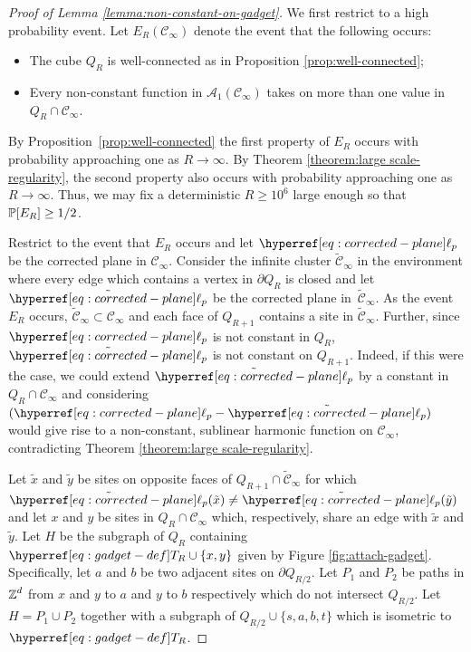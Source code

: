 \documentclass[12pt]{amsart}
\numberwithin{equation}{section}
\begin{document}
	\begin{proof}[Proof of Lemma \ref{lemma:non-constant-on-gadget}]
		We first restrict to a high probability event. Let $E_R(\mathscr{C}_{\infty})$ denote the event that the following occurs: 
		\begin{itemize}
			\item The cube $Q_R$ is well-connected as in Proposition \ref{prop:well-connected};
			\item Every non-constant function in $\mathcal{A}_1(\mathscr{C}_{\infty})$ takes on more than one value in $Q_R \cap \mathscr{C}_{\infty}$.  
		\end{itemize}
		By Proposition~\ref{prop:well-connected} the first property of $E_R$ occurs with probability approaching one as $R \to \infty$. By Theorem \ref{theorem:large scale-regularity}, the second property also occurs with probability approaching one as $R \to \infty$. Thus, we may fix a deterministic $R \geq 10^6$ large enough so that $\P[E_R] \geq 1/2$. 
		
		Restrict to the event that $E_R$ occurs and let $\ellp{p}$ be the corrected plane in $\mathscr{C}_{\infty}$.  Consider the infinite cluster $\mathscr{\tilde C}_{\infty}$ in the environment where every edge which contains a vertex in $\partial Q_R$ is closed
		and let $\tilde{\ellp{p}}$ be the corrected plane in~$\mathscr{\tilde C}_{\infty}$. As the event $E_R$ occurs, $\mathscr{\tilde C}_{\infty} \subset \mathscr{C}_{\infty}$ and each face of $Q_{R+1}$ contains a site in $\mathscr{\tilde C}_{\infty}$. Further, since $\ellp{p}$ is not constant in $Q_R$, $\tilde{\ellp{p}} $ is not constant on $Q_{R+1}$. Indeed, if this were the case, 
		we could extend $\tilde{\ellp{p}}$ by a constant in $Q_{R} \cap \mathscr{C}_{\infty}$ and considering $(\ellp{p} -\tilde{\ellp{p}})$ would give rise to a non-constant, sublinear harmonic function on $\mathscr{C}_{\infty}$, contradicting 
		Theorem \ref{theorem:large scale-regularity}. 
		
		Let $\tilde x$ and $\tilde y$ be sites on opposite faces of $Q_{R+1} \cap \mathscr{\tilde C}_{\infty}$ for which $\tilde{\ellp{p}} (\tilde x) \neq \tilde{\ellp{p}}(\tilde y)$ and let $x$ and $y$ be sites  in $Q_R \cap \mathscr{C}_{\infty}$ which, respectively, share an edge with $\tilde x$ and $\tilde y$. Let $H$ be the subgraph of $Q_R$ containing $\Tn{R} \cup \{x, y\}$  given by Figure \ref{fig:attach-gadget}. 
		Specifically, let $a$ and $b$ be two adjacent sites on $\partial Q_{R/2}$. Let $P_1$ and $P_2$ be paths in $\Z^d$ from $x$ and $y$ to $a$ and $y$ to $b$ respectively which do not intersect $Q_{R/2}$. 
		Let $H = P_1 \cup P_2$ together with a subgraph of $Q_{R/2} \cup \{s, a, b, t\}$ which is isometric to $\Tn{R}$. 
		

\end{proof}
\end{document}
